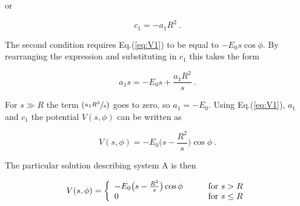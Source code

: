 \documentclass[a4paper]{jpconf}
\begin{document}
\noindent or 

\begin{equation}
c_1 = - a_1 R^2 ~.
\end{equation}

\noindent The second condition requires Eq.(\ref{eq:V1}) to be equal to $-E_0 s \cos{\phi}$. By rearranging the expression and substituting in $c_1$ this takes the form

\begin{equation}
a_1 s = -E_0 s + \frac{a_1 R^2}{s}~.
\end{equation}

\noindent For $s \gg R$ the term $(\sfrac{a_1 R^2}{s})$ goes to zero, so $a_1 = -E_0$.
Using Eq.(\ref{eq:V1}), $a_1$ and $c_1$ the potential $V(s,\phi)$ can be written as

\begin{equation}
V(s,\phi) = - E_0 \bigg(s - \frac{R^2}{s}\bigg) \cos{\phi}~.
\label{eq:V2}
\end{equation}

%
%
%
%

\noindent The particular solution describing system A is then

\begin{equation}
V(s,\phi) = \left\{ 
  \begin{array}{l l}
   -E_0 \big(s - \frac{R^2}{s}\big) \cos{\phi}  & \qquad \text{for $s > R$}\\
    0 & \qquad \text{for $s \le R$}
  \end{array} \right.
\end{equation}
\end{document}
